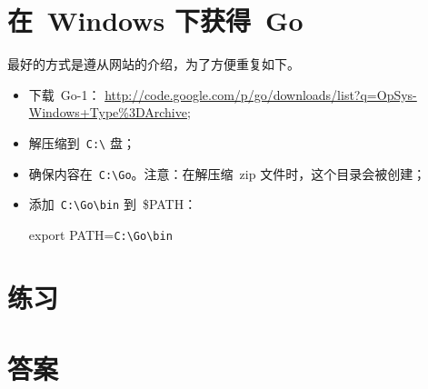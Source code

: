 \section{在~Windows 下获得~Go}

最好的方式是遵从网站\cite{go_install}的介绍，为了方便重复如下。

\begin{itemize}
\item 下载~Go-1：
\url{http://code.google.com/p/go/downloads/list?q=OpSys-Windows+Type%3DArchive};
\item 解压缩到~\verb|C:\| 盘；
\item 确保内容在~\verb|C:\Go|。注意：在解压缩~zip 文件时，这个目录会被创建；
\item 添加~\verb|C:\Go\bin| 到~\$PATH：
\begin{display}
export PATH=\verb|C:\Go\bin|
\end{display}
\end{itemize}

\section{练习}


\cleardoublepage
\section{答案}
\shipoutAnswer
